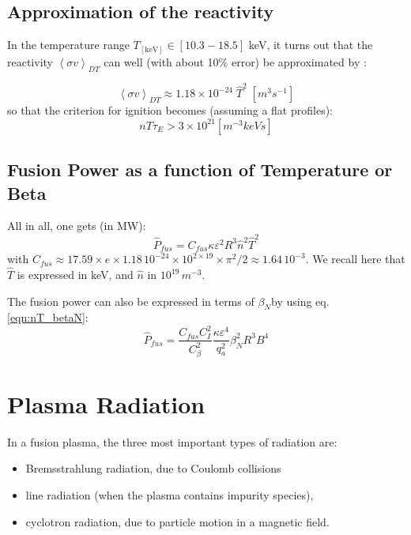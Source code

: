 \subsection{Approximation of the reactivity}
In the temperature range $T_{\mathrm{[keV]}} \in [10.3-18.5]$ keV, it turns out that the reactivity $\left< \sigma v \right>_{DT}$ can well (with about 10$\%$ error) be approximated by \cite[(1.5.4)]{Wesson2004}: 

\begin{equation}
\left< \sigma v \right>_{DT} 
\approx 
1.18 \times 10^{-24}\; \hat T^2 \;\si{\left[m^3 s^{-1}\right]}
\end{equation}
so that the criterion for ignition becomes (assuming a flat profiles): 
\begin{equation*}
    n T \tau_E > 3 \times 10^{21} \si{\left[m^{-3} keV s \right]}
\end{equation*}


\subsection{Fusion Power as a function of Temperature or Beta}
All in all, one gets (in MW):
\begin{equation}
\hat P_{fus} = C_{fus} \kappa \varepsilon^2 R^3 \hat n^2 \hat T^2  
\label{eq:DT_fusion_power}
\end{equation}
with $C_{fus} \approx 17.59 \times e\times 1.18\, 10^{-24} \times 10^{2\times19}\times \pi^2/2 \approx 1.64\, 10^{-3}$. We recall here that $\hat T$ is expressed in keV, and $\hat n$ in $10^{19} \, \si{m^{-3}}$. 


The fusion power can also be expressed in terms of $\beta_N$by using eq.\ref{eqn:nT_betaN}:
\begin{equation}
\hat P_{fus} = \frac{C_{fus}C_I^2}{C_\beta^2} \frac{\kappa \varepsilon^4}{q_a^2} 
\beta_N^2 R^3 B^4 
\label{eq:DT_fusion_power_betaN}
\end{equation}



\section{Plasma Radiation}\label{sec:plasma_radiation}
In a fusion plasma, the three most important types of radiation are: 
\begin{itemize}
	\item Bremsstrahlung radiation, due to Coulomb collisions 
	\item line radiation (when the plasma contains impurity species), 
	\item cyclotron radiation, due to particle motion in a magnetic field.
\end{itemize}


